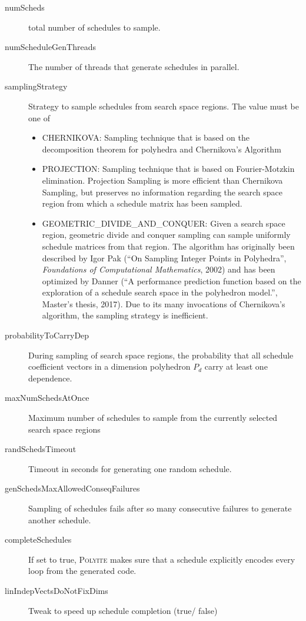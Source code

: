 \documentclass{article}
\begin{document}
\begin{description}
  \item[numScheds] total number of schedules to sample.
  \item[numScheduleGenThreads] The number of threads that generate schedules in
    parallel.
  \item[samplingStrategy] Strategy to sample schedules from search space
    regions. The value must be one of
  \begin{itemize}
    \item CHERNIKOVA: Sampling technique that is based on the decomposition
      theorem for polyhedra and Chernikova's Algorithm
    \item PROJECTION: Sampling technique that is based on Fourier-Motzkin
      elimination. Projection Sampling is more efficient than Chernikova
      Sampling, but preserves no information regarding the search space region
      from which a schedule matrix has been sampled.
    \item GEOMETRIC\_DIVIDE\_AND\_CONQUER: Given a search space region,
      geometric divide and conquer sampling can sample uniformly schedule
      matrices from that region. The algorithm has originally been described by
      Igor Pak (\enquote{On Sampling Integer Points in Polyhedra},
      \textit{Foundations of Computational Mathematics}, 2002) and has been
      optimized by Danner (\enquote{A performance prediction function based on
      the exploration of a schedule search space in the polyhedron model.},
      Master's thesis, 2017). Due to its many invocations of Chernikova's
      algorithm, the sampling strategy is inefficient.
  \end{itemize}
  \item[probabilityToCarryDep] During sampling of search space regions, the
    probability that all schedule coefficient vectors in a dimension polyhedron
    $P_d$ carry at least one dependence.
  \item[maxNumSchedsAtOnce] Maximum number of schedules to sample from the
    currently selected search space regions
  \item[randSchedsTimeout] Timeout in seconds for generating one random
    schedule.
  \item[genSchedsMaxAllowedConseqFailures] Sampling of schedules fails after
    so many consecutive failures to generate another schedule.
  \item[completeSchedules] If set to true, \textsc{Polyite} makes sure that a
    schedule explicitly encodes every loop from the generated code.
  \item[linIndepVectsDoNotFixDims] Tweak to speed up schedule completion
    (true/ false)
\end{description}
\end{document}
